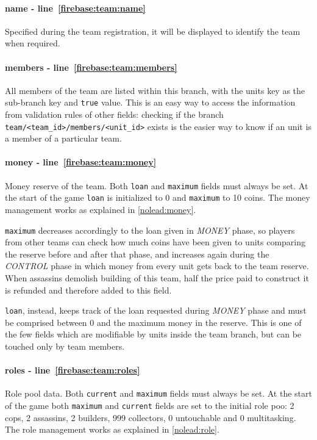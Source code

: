 				\paragraph{name - line~\ref{firebase:team:name}}
				Specified during the team registration, it will be displayed to identify the team when required.
			
				\paragraph{members - line~\ref{firebase:team:members}}
				All members of the team are listed within this branch, with the units key as the sub-branch key and \lstinline|true| value. This is an easy way to access the information from validation rules of other fields: checking if the branch \lstinline|team/<team_id>/members/<unit_id>| exists is the easier way to know if an unit is a member of a particular team.
			
				\paragraph{money - line~\ref{firebase:team:money}}
				Money reserve of the team. Both \lstinline|loan| and \lstinline|maximum| fields must always be set. At the start of the game \lstinline|loan| is initialized to 0 and \lstinline|maximum| to 10 coins.
				The money management works as explained in \autoref{nolead:money}.
				
				\lstinline|maximum| decreases accordingly to the loan given in \emph{MONEY} phase, so players from other teams can check how much coins have been given to units comparing the reserve before and after that phase, and increases again during the \emph{CONTROL} phase in which money from every unit gets back to the team reserve.
				When assassins demolish building of this team, half the price paid to construct it is refunded and therefore added to this field.
				
				\lstinline|loan|, instead, keeps track of the loan requested during \emph{MONEY} phase and must be comprised between 0 and the maximum money in the reserve. This is one of the few fields which are modifiable by units inside the team branch, but can be touched only by team members.
				
				\paragraph{roles - line~\ref{firebase:team:roles}}
				Role pool data. Both \lstinline|current| and \lstinline|maximum| fields must always be set. At the start of the game both \lstinline|maximum| and \lstinline|current| fields are set to the initial role poo: 2 cops, 2 assassins, 2 builders, 999 collectors, 0 untouchable and 0 multitasking.
				The role management works as explained in \autoref{nolead:role}.
				
